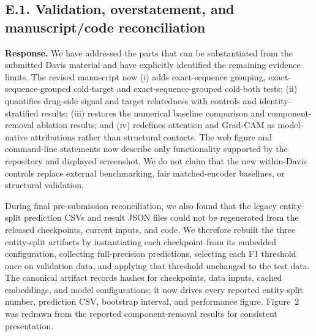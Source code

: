 \documentclass[11pt,a4paper]{article}
\newcommand{\response}{\noindent\textbf{Response.} }
\begin{document}
\subsection*{E.1. Validation, overstatement, and manuscript/code reconciliation}


\response We have addressed the parts that can be substantiated from the
submitted Davis material and have explicitly identified the remaining evidence
limits.  The revised manuscript now (i) adds exact-sequence grouping,
exact-sequence-grouped cold-target and exact-sequence-grouped cold-both tests;
(ii) quantifies
drug-side signal and target relatedness with controls and identity-stratified
  results; (iii) restores the numerical baseline comparison and component-removal
  ablation results; and (iv) redefines attention and Grad-CAM as
model-native attributions rather than structural contacts.  The web figure and
command-line statements now describe only functionality supported by the
repository and displayed screenshot.  We do not claim that the new within-Davis
controls replace external benchmarking, fair matched-encoder baselines, or
structural validation.

During final pre-submission reconciliation, we also found that the legacy
entity-split prediction CSVs and result JSON files could not be regenerated from
the released checkpoints, current inputs, and code. We therefore rebuilt the
three entity-split artifacts by instantiating each checkpoint from its embedded
configuration, collecting full-precision predictions, selecting each F1
threshold once on validation data, and applying that threshold unchanged to the
test data. The canonical artifact records hashes for checkpoints, data inputs,
cached embeddings, and model configurations; it now drives every reported
entity-split number, prediction CSV, bootstrap interval, and performance
figure. Figure~2 was redrawn from the reported component-removal results for
consistent presentation.
\end{document}
